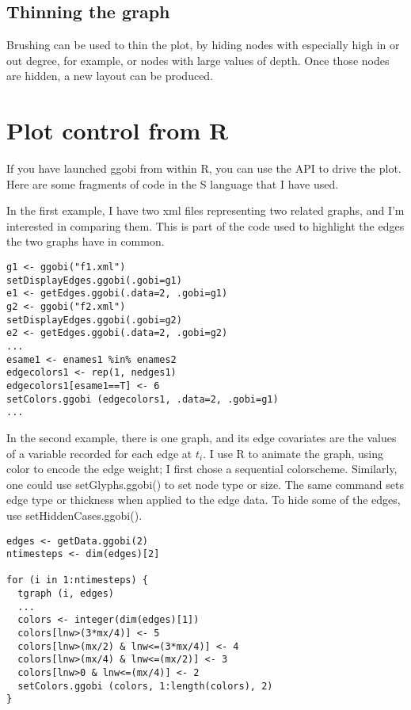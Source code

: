 \documentclass[11pt]{article}
\begin{document}
\subsection{Thinning the graph}

Brushing can be used to thin the plot, by hiding nodes with especially
high in or out degree, for example, or nodes with large values of depth.
Once those nodes are hidden, a new layout can be produced.

\section{Plot control from R}

If you have launched ggobi from within R, you can use the API to
drive the plot.  Here are some fragments of code in the S language
that I have used.

In the first example, I have two xml files representing two
related graphs, and I'm interested in comparing them.  This is
part of the code used to highlight the edges the two graphs
have in common.

\begin{verbatim}
g1 <- ggobi("f1.xml")
setDisplayEdges.ggobi(.gobi=g1)
e1 <- getEdges.ggobi(.data=2, .gobi=g1)
g2 <- ggobi("f2.xml")
setDisplayEdges.ggobi(.gobi=g2)
e2 <- getEdges.ggobi(.data=2, .gobi=g2)
...
esame1 <- enames1 %in% enames2
edgecolors1 <- rep(1, nedges1)
edgecolors1[esame1==T] <- 6
setColors.ggobi (edgecolors1, .data=2, .gobi=g1)
...
\end{verbatim}


In the second example, there is one graph, and its edge covariates are
the values of a variable recorded for each edge at $t_i$.  I use R to
animate the graph, using color to encode the edge weight; I first chose
a sequential colorscheme.  Similarly, one could use setGlyphs.ggobi() to
set node type or size.  The same command sets edge type or thickness
when applied to the edge data.  To hide some of the edges, use
setHiddenCases.ggobi().

\begin{verbatim}
edges <- getData.ggobi(2)
ntimesteps <- dim(edges)[2]

for (i in 1:ntimesteps) {
  tgraph (i, edges)
  ...
  colors <- integer(dim(edges)[1])
  colors[lnw>(3*mx/4)] <- 5
  colors[lnw>(mx/2) & lnw<=(3*mx/4)] <- 4
  colors[lnw>(mx/4) & lnw<=(mx/2)] <- 3
  colors[lnw>0 & lnw<=(mx/4)] <- 2
  setColors.ggobi (colors, 1:length(colors), 2)
}
\end{verbatim}
\end{document}
